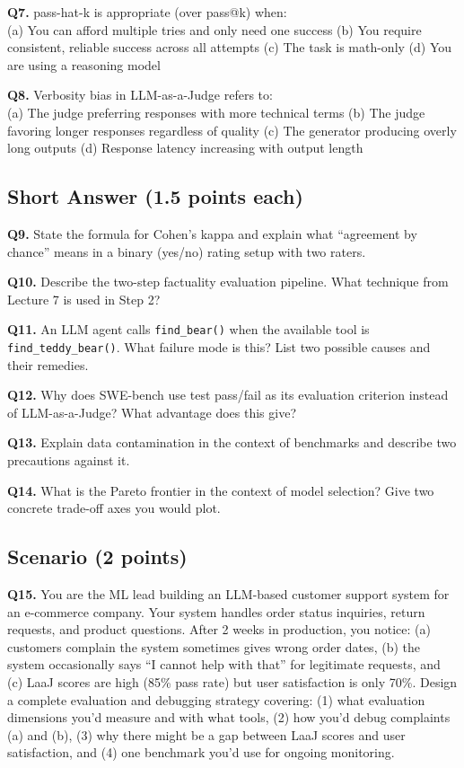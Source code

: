 \documentclass[11pt, a4paper]{article}
\begin{document}
\textbf{Q7.} pass-hat-k is appropriate (over pass@k) when:\\
(a) You can afford multiple tries and only need one success\quad
(b) You require consistent, reliable success across all attempts\quad
(c) The task is math-only\quad
(d) You are using a reasoning model

\textbf{Q8.} Verbosity bias in LLM-as-a-Judge refers to:\\
(a) The judge preferring responses with more technical terms\quad
(b) The judge favoring longer responses regardless of quality\quad
(c) The generator producing overly long outputs\quad
(d) Response latency increasing with output length

\subsection*{Short Answer (1.5 points each)}

\textbf{Q9.} State the formula for Cohen's kappa and explain what ``agreement by chance'' means in a binary (yes/no) rating setup with two raters.

\textbf{Q10.} Describe the two-step factuality evaluation pipeline. What technique from Lecture 7 is used in Step 2?

\textbf{Q11.} An LLM agent calls \texttt{find\_bear()} when the available tool is \texttt{find\_teddy\_bear()}. What failure mode is this? List two possible causes and their remedies.

\textbf{Q12.} Why does SWE-bench use test pass/fail as its evaluation criterion instead of LLM-as-a-Judge? What advantage does this give?

\textbf{Q13.} Explain data contamination in the context of benchmarks and describe two precautions against it.

\textbf{Q14.} What is the Pareto frontier in the context of model selection? Give two concrete trade-off axes you would plot.

\subsection*{Scenario (2 points)}

\textbf{Q15.} You are the ML lead building an LLM-based customer support system for an e-commerce company. Your system handles order status inquiries, return requests, and product questions. After 2 weeks in production, you notice: (a) customers complain the system sometimes gives wrong order dates, (b) the system occasionally says ``I cannot help with that'' for legitimate requests, and (c) LaaJ scores are high (85\% pass rate) but user satisfaction is only 70\%. Design a complete evaluation and debugging strategy covering: (1) what evaluation dimensions you'd measure and with what tools, (2) how you'd debug complaints (a) and (b), (3) why there might be a gap between LaaJ scores and user satisfaction, and (4) one benchmark you'd use for ongoing monitoring.
\newpage
\end{document}
